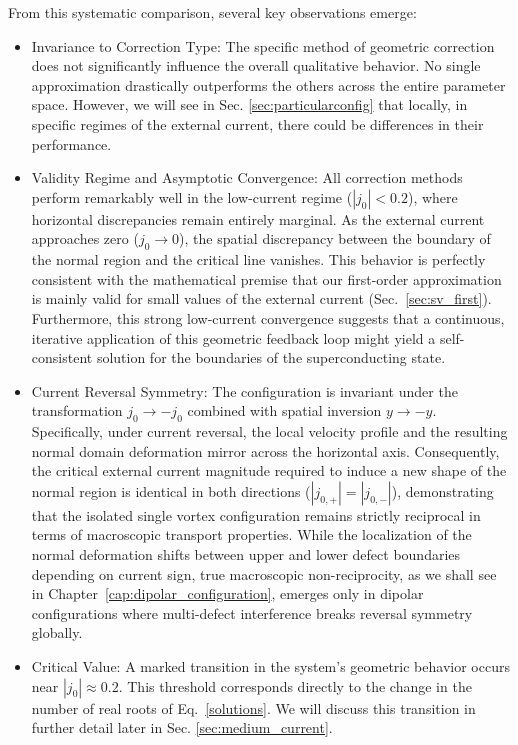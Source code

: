 \documentclass[english,binding=0.6cm,noexaminfo]{sapthesis}
\begin{document}
From this systematic comparison, several key observations emerge:
\begin{itemize}
    \item Invariance to Correction Type: The specific method of geometric correction does not significantly influence the overall qualitative behavior. No single approximation drastically outperforms the others across the entire parameter space. However, we will see in Sec. \ref{sec:particularconfig} that locally, in specific regimes of the external current, there could be differences in their performance.
    \item Validity Regime and Asymptotic Convergence: All correction methods perform remarkably well in the low-current regime ($|j_0| < 0.2$), where horizontal discrepancies remain entirely marginal. As the external current approaches zero ($j_0 \to 0$), the spatial discrepancy between the boundary of the normal region and the critical line vanishes. This behavior is perfectly consistent with the mathematical premise that our first-order approximation is mainly valid for small values of the external current (Sec.~\ref{sec:sv_first}). Furthermore, this strong low-current convergence suggests that a continuous, iterative application of this geometric feedback loop might yield a self-consistent solution for the boundaries of the superconducting state.
    \item Current Reversal Symmetry: The configuration is invariant under the transformation $j_0 \to -j_0$ combined with spatial inversion $y\rightarrow-y$. Specifically, under current reversal, the local velocity profile and the resulting normal domain deformation mirror across the horizontal axis. Consequently, the critical external current magnitude required to induce a new shape of the normal region is identical in both directions ($|j_{0,+}| = |j_{0,-}|$), demonstrating that the isolated single vortex configuration remains strictly reciprocal in terms of macroscopic transport properties. While the localization of the normal deformation shifts between upper and lower defect boundaries depending on current sign, true macroscopic non-reciprocity, as we shall see in Chapter~\ref{cap:dipolar_configuration}, emerges only in dipolar configurations where multi-defect interference breaks reversal symmetry globally.
    \item Critical Value: A marked transition in the system's geometric behavior occurs near $|j_0|\approx0.2$. This threshold corresponds directly to the change in the number of real roots of Eq.~\eqref{solutions}. We will discuss this transition in further detail later in Sec. \ref{sec:medium_current}.
\end{itemize}
\end{document}
